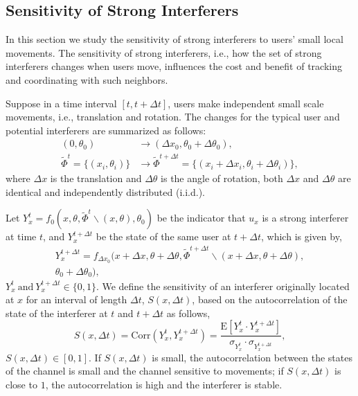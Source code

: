 \documentclass[10pt, conference, letterpaper]{IEEEtran}
\begin{document}


\subsection{Sensitivity of Strong Interferers}\label{section:channel:sensitivity}
In this section we study the sensitivity of strong interferers to users' small local movements.
The sensitivity of strong interferers, i.e., how the set of strong interferers changes when users move, influences the cost and benefit of tracking and coordinating with such neighbors.
 
Suppose in a time interval $[t, t+ \Delta t]$, users make independent small scale movements, i.e., translation and rotation. 
The changes for the typical user and potential interferers are summarized as follows:
\begin{equation*}
\begin{split}
(0,\theta_0)&\rightarrow(\Delta x_0, \theta_0 + \Delta\theta_0), \\
\tilde{\Phi}^{t}=\{(x_i, \theta_i)\}&\rightarrow\tilde{\Phi}^{t+\Delta t}=\{(x_i+\Delta x_i, \theta_i + \Delta\theta_i)\},
\end{split}
\end{equation*}
where $\Delta x$ is the translation and $\Delta \theta$ is the angle of rotation, both $\Delta x$ and $\Delta\theta$ are identical and independently distributed (i.i.d.).

Let $Y_x^t=f_0(x, \theta, \tilde{\Phi}^t\backslash (x, \theta), \theta_0)$ be the indicator that $u_x$ is a strong interferer at time $t$, and $Y_x^{t+\Delta t}$ be the state of the same user at $t+\Delta t$, which is given by,
\begin{multline*}
Y_{x}^{t+\Delta t} = f_{\Delta x_0}(x+\Delta x, \theta + \Delta\theta, \tilde{\Phi}^{t+\Delta t}\backslash (x+\Delta x, \theta + \Delta\theta), \\
\theta_0 + \Delta\theta_0),
\end{multline*}
$Y_x^t \mathrm{~and~} Y_{x}^{t+\Delta t} \in \{0,1\}$. 
We define the sensitivity of an interferer originally located at $x$ for an interval of length $\Delta t$, $S(x, \Delta t)$, based on the autocorrelation of the state of the interferer at $t$ and $t+\Delta t$ as follows, 
\begin{equation}
S(x, \Delta t)
=\mathrm{Corr}(Y_x^t, Y_x^{t+\Delta t})
=\frac{\mathrm{E}[Y_x^t\cdot Y_x^{t + \Delta t}]}{\sigma_{Y_x^t}\cdot \sigma_{Y_x^{t+\Delta t}}},
\end{equation}
$S(x, \Delta t)\in [0,1]$. If $S(x, \Delta t)$ is small, the autocorrelation between the states of the channel is small and the channel sensitive to movements; if $S(x, \Delta t)$ is close to $1$, the autocorrelation is high and the interferer is stable.
\end{document}
